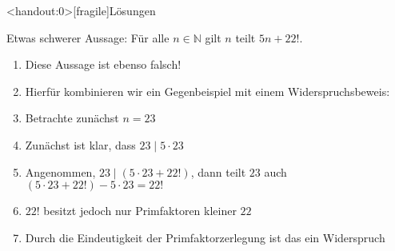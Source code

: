 {
\begin{frame}<handout:0>[fragile]{Lösungen}   
    \begin{block}{Etwas schwerer}
        Aussage: Für alle $n \in \mathbb{N}$ gilt $n$ teilt $5n + 22!$.
        \begin{enumerate}
            \item<2-> Diese Aussage ist ebenso falsch!
            \item<3-> Hierfür kombinieren wir ein Gegenbeispiel mit einem Widerspruchsbeweis:
            \item<4-> Betrachte zunächst $n = 23$
            \item<5-> Zunächst ist klar, dass $23 \mid 5\cdot23$
            \item<6-> Angenommen, $23 \mid (5\cdot23 + 22!)$, dann teilt $23$ auch $(5\cdot23+22!)-5\cdot23 = 22!$
            \item<7-> $22!$ besitzt jedoch nur Primfaktoren kleiner $22$
            \item<8-> Durch die Eindeutigkeit der Primfaktorzerlegung ist das ein Widerspruch
        \end{enumerate}
    \end{block}
\end{frame}
}